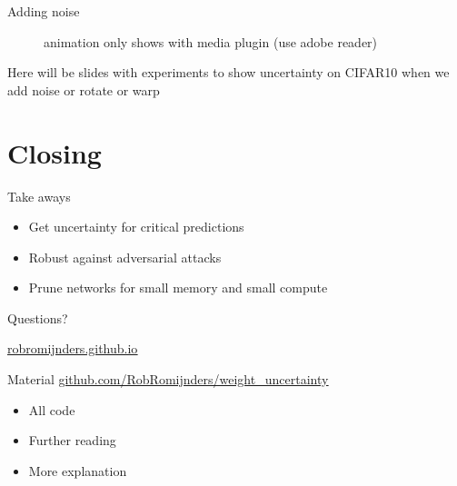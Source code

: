 \documentclass{beamer}
\newcommand{\mdlink}[2]{\href{#2}{\underline{#1}}}
\begin{document}
\begin{frame}{Adding noise}
	\begin{figure}
		\centering
		\hspace*{-25mm}
		\caption{animation only shows with media plugin (use adobe reader)}
	\end{figure}
\end{frame}


\else

\begin{frame}
	Here will be slides with experiments to show uncertainty on CIFAR10 when we add noise or rotate or warp
\end{frame}

\fi

\section{Closing}
\begin{frame}
	\centerline{Take aways}
	\begin{itemize}
		\item Get uncertainty for critical predictions
		\item Robust against adversarial attacks
		\item Prune networks for small memory and small compute
	\end{itemize}
\end{frame}

\begin{frame}
	\centerline{\Huge{Questions?}}
	
	\centerline{  }
	\centerline{\mdlink{robromijnders.github.io}{http://robromijnders.github.io/}}
	\centerline{  }
	
	\begin{block}{Material}
		\mdlink{\url{github.com/RobRomijnders/weight_uncertainty}}{github.com/RobRomijnders/weight_uncertainty}
		\centerline{  }
		\begin{itemize}
			\item All code
			\item Further reading
			\item More explanation
		\end{itemize}
	\end{block}
\end{frame}
\end{document}
